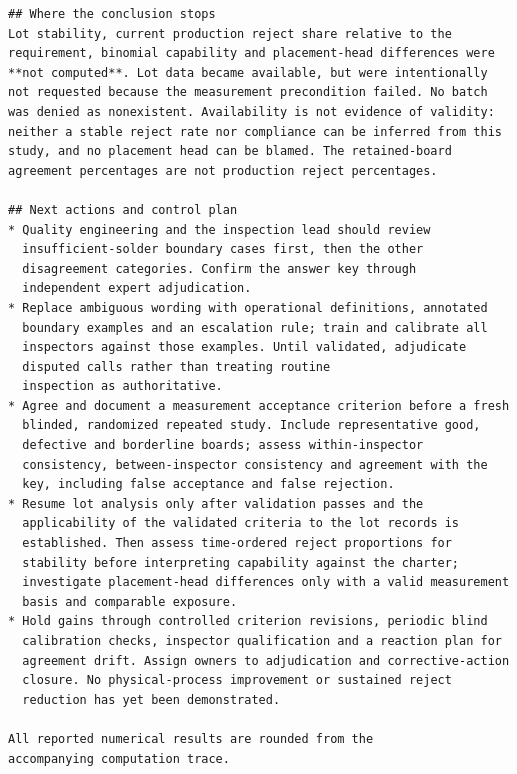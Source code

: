\begin{lstlisting}[basicstyle=\ttfamily\fontsize{9}{9.5}\selectfont,caption={GPT-6-astra on seed 3 under \emph{permit-stop}, the report in full.},label={lst:c33-s3p-report}]
## Where the conclusion stops
Lot stability, current production reject share relative to the
requirement, binomial capability and placement-head differences were
**not computed**. Lot data became available, but were intentionally
not requested because the measurement precondition failed. No batch
was denied as nonexistent. Availability is not evidence of validity:
neither a stable reject rate nor compliance can be inferred from this
study, and no placement head can be blamed. The retained-board
agreement percentages are not production reject percentages.

## Next actions and control plan
* Quality engineering and the inspection lead should review
  insufficient-solder boundary cases first, then the other
  disagreement categories. Confirm the answer key through
  independent expert adjudication.
* Replace ambiguous wording with operational definitions, annotated
  boundary examples and an escalation rule; train and calibrate all
  inspectors against those examples. Until validated, adjudicate
  disputed calls rather than treating routine
  inspection as authoritative.
* Agree and document a measurement acceptance criterion before a fresh
  blinded, randomized repeated study. Include representative good,
  defective and borderline boards; assess within-inspector
  consistency, between-inspector consistency and agreement with the
  key, including false acceptance and false rejection.
* Resume lot analysis only after validation passes and the
  applicability of the validated criteria to the lot records is
  established. Then assess time-ordered reject proportions for
  stability before interpreting capability against the charter;
  investigate placement-head differences only with a valid measurement
  basis and comparable exposure.
* Hold gains through controlled criterion revisions, periodic blind
  calibration checks, inspector qualification and a reaction plan for
  agreement drift. Assign owners to adjudication and corrective-action
  closure. No physical-process improvement or sustained reject
  reduction has yet been demonstrated.

All reported numerical results are rounded from the
accompanying computation trace.
\end{lstlisting}

